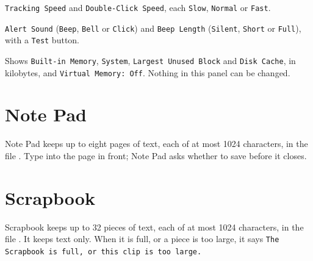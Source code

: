 \texttt{Tracking Speed} and \texttt{Double-Click Speed}, each
\texttt{Slow}, \texttt{Normal} or \texttt{Fast}.

\texttt{Alert Sound} (\texttt{Beep}, \texttt{Bell} or
\texttt{Click}) and \texttt{Beep Length} (\texttt{Silent}, \texttt{Short} or
\texttt{Full}), with a \texttt{Test} button.

Shows \texttt{Built-in Memory}, \texttt{System},
\texttt{Largest Unused Block} and \texttt{Disk Cache}, in kilobytes, and
\texttt{Virtual Memory: Off}.  Nothing in this panel can be changed.

\section{Note Pad}
Note Pad keeps up to eight pages of text, each of at most 1024 characters,
in the file .  Type into the page in front; Note Pad asks
whether to save before it closes.

\section{Scrapbook}
Scrapbook keeps up to 32 pieces of text, each of at most 1024 characters, in
the file .  It keeps text only.  When it is full, or a
piece is too large, it says \texttt{The Scrapbook is full, or this clip is
too large.}
